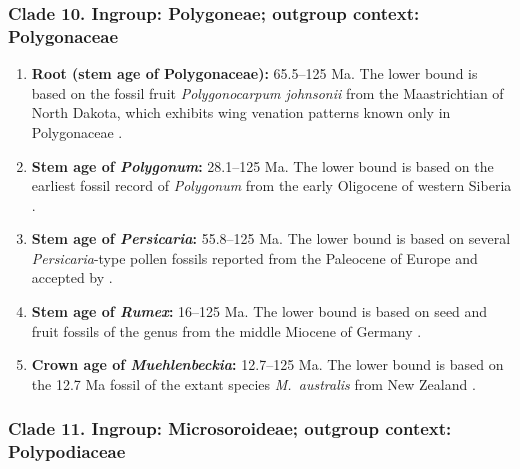 \documentclass[10pt]{article}
\begin{document}
\subsubsection*{Clade 10. Ingroup: Polygoneae; outgroup context:
  Polygonaceae}

\begin{enumerate}

\item \textbf{Root (stem age of Polygonaceae):} 65.5--125 Ma. The
  lower bound is based on the fossil fruit \textit{Polygonocarpum
    johnsonii} from the Maastrichtian of North Dakota, which exhibits
  wing venation patterns known only in Polygonaceae
  \citep{Manchester2010}.

\item \textbf{Stem age of \textit{Polygonum}:} 28.1--125 Ma. The
  lower bound is based on the earliest fossil record of
  \textit{Polygonum} from the early Oligocene of western Siberia
  \citep{Dorofeev1963}.

\item \textbf{Stem age of \textit{Persicaria}:} 55.8--125 Ma. The
  lower bound is based on several \textit{Persicaria}-type pollen
  fossils reported from the Paleocene of Europe
  \citep{Krutzsch1970,Gruas1978} and accepted by \citet{Muller1981}.

\item \textbf{Stem age of \textit{Rumex}:} 16--125 Ma. The lower
  bound is based on seed and fruit fossils of the genus from the
  middle Miocene of Germany \citep{Mai2001}.

\item \textbf{Crown age of \textit{Muehlenbeckia}:} 12.7--125 Ma. The
  lower bound is based on the 12.7 Ma fossil of the extant species
  \textit{M.~australis} from New Zealand
  \citep{Pole1993,Schuster2013}.

\end{enumerate}

\subsubsection*{Clade 11. Ingroup: Microsoroideae; outgroup context:
  Polypodiaceae}

\end{document}
